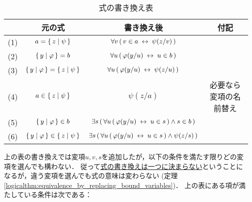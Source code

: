 	\begin{table}[H]
		\begin{center}
		\caption{式の書き換え表}
		\begin{tabular}{c|c|c|c}
			 & 元の式 & 書き換え後 & 付記 \\ \hline \hline
			(1) & $a = \{\, z \mid \psi\, \}$ & $\forall v\, (\, v \in a \hspace{0.25em}\leftrightarrow\hspace{0.25em} \psi(z/v)\, )$ & \\ \hline
			(2) & $\{\, y \mid \varphi\, \} = b$ & $\forall u\, (\, \varphi(y/u) \hspace{0.25em}\leftrightarrow\hspace{0.25em} u \in b\, )$ & \\ \hline
			(3) & $\{\, y \mid \varphi\, \} = \{\, z \mid \psi\, \}$ & $\forall u\, (\, \varphi(y/u) \hspace{0.25em}\leftrightarrow\hspace{0.25em} \psi(z/u)\, )$ & \\ \hline
			(4) & $a \in \{\, z \mid \psi\, \}$ & $\psi(z/a)$ & 必要なら変項の名前替え \\ \hline
			(5) & $\{\, y \mid \varphi\, \} \in b$ & $\exists s\, (\, \forall u\, (\, \varphi(y/u) \hspace{0.25em}\leftrightarrow\hspace{0.25em} u \in s\, ) \wedge s \in b\, )$ & \\ \hline
			(6) & $\{\, y \mid \varphi\, \} \in \{\, z \mid \psi\, \}$ & $\exists s\, (\, \forall u\, (\, \varphi(y/u) \hspace{0.25em}\leftrightarrow\hspace{0.25em} u \in s\, ) \wedge \psi(z/s)\, )$ & \\ \hline
		\end{tabular}
		\label{tab:formula_rewriting}
		\end{center}
	\end{table}
	
	上の表の書き換えでは変項$u,v,s$を追加したが，以下の条件を満たす限りどの変項を選んでも構わない．
	従って\underline{式の書き換えは一つに決まらない}ということになるが，違う変項を選んでも式の意味は変わらない
	(定理\ref{logicalthm:equivalence_by_replacing_bound_variables})．
	上の表にある項が満たしている条件は次である：
			
